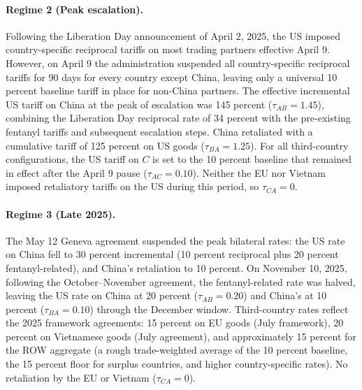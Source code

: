 \documentclass[11pt]{article}
\theoremstyle{plain}
\theoremstyle{remark}
\numberwithin{lemma}{section}
\numberwithin{proposition}{section}
\numberwithin{corollary}{section}
\newcommand{\rev}[1]{{\color{RevBlue}#1}}
\begin{document}
\begin{appendix}
\paragraph{Regime 2 (Peak escalation).} Following the Liberation Day announcement of April 2, 2025, the US imposed country-specific reciprocal tariffs on most trading partners effective April 9. However, on April 9 the administration suspended all country-specific reciprocal tariffs for 90 days for every country except China, leaving only a universal 10 percent baseline tariff in place for non-China partners. The effective incremental US tariff on China at the peak of escalation was 145 percent ($\tau_{AB} = 1.45$), combining the Liberation Day reciprocal rate of 34 percent with the pre-existing fentanyl tariffs and subsequent escalation steps. China retaliated with a cumulative tariff of 125 percent on US goods ($\tau_{BA} = 1.25$). For all third-country configurations, the US tariff on $C$ is set to the 10 percent baseline that remained in effect after the April 9 pause ($\tau_{AC} = 0.10$). Neither the EU nor Vietnam imposed retaliatory tariffs on the US during this period, so $\tau_{CA} = 0$.

\rev{\paragraph{Regime 3 (Late 2025).} The May 12 Geneva agreement suspended the peak bilateral rates: the US rate on China fell to 30 percent incremental (10 percent reciprocal plus 20 percent fentanyl-related), and China's retaliation to 10 percent. On November 10, 2025, following the October--November agreement, the fentanyl-related rate was halved, leaving the US rate on China at 20 percent ($\tau_{AB} = 0.20$) and China's at 10 percent ($\tau_{BA} = 0.10$) through the December window. Third-country rates reflect the 2025 framework agreements: 15 percent on EU goods (July framework), 20 percent on Vietnamese goods (July agreement), and approximately 15 percent for the ROW aggregate (a rough trade-weighted average of the 10 percent baseline, the 15 percent floor for surplus countries, and higher country-specific rates). No retaliation by the EU or Vietnam ($\tau_{CA} = 0$).}


\end{appendix}
\end{document}
